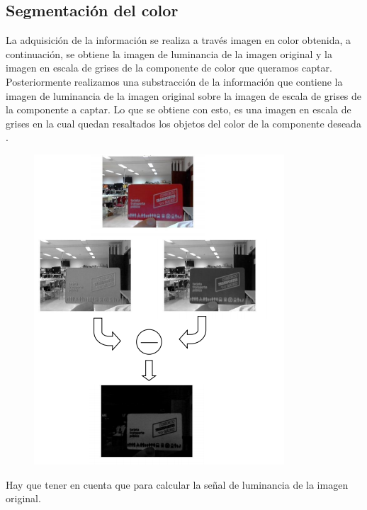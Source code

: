 \documentclass[10pt]{article}
\begin{document}
\subsection{Segmentación del color}

La adquisición de la información se realiza a través imagen
en color obtenida, a continuación, se obtiene la
imagen de luminancia de la imagen original y la imagen en
escala de grises de la componente de color que queramos captar.
Posteriormente realizamos una substracción de la información
que contiene la imagen de luminancia de la imagen original
sobre la imagen de escala de grises de la componente a captar.
Lo que se obtiene con esto, es una imagen en escala de grises en
la cual quedan resaltados los objetos del color de la componente
deseada \cite{IEEEreferencias:Ref47}.

\begin{figure}[H]
	\begin{center}
\includegraphics[scale = 0.85]{Imagenes/segmentacion.png}
	\end{center} 
\end{figure}

Hay que tener en cuenta que para calcular la señal de luminancia de la imagen original.
\end{document}
